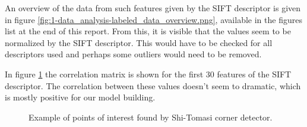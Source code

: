 An overview of the data from such features given by the SIFT descriptor is given in figure \ref{fig:1-data_analysis-labeled_data_overview.png}, available in the figures list at the end of this report.
From this, it is visible that the values seem to be normalized by the SIFT descriptor.
This would have to be checked for all descriptors used and perhaps some outliers would need to be removed.

In figure \ref{fig:1-data_analysis-correlation_matrix} the correlation matrix is shown for the first 30 features of the SIFT descriptor.
The correlation between these values doesn't seem to dramatic, which is mostly positive for our model building.

\begin{figure}[H]
    \centering
    \captionsetup{width=0.7\linewidth}
    \captionsetup{justification=centering}
    \caption{Example of points of interest found by Shi-Tomasi corner detector.}
    \label{fig:1-data_analysis-correlation_matrix}
\end{figure}